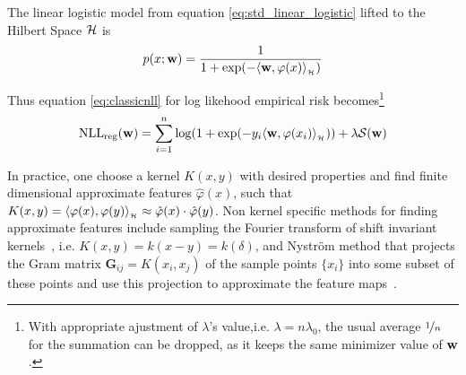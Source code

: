 The linear logistic model from equation \ref{eq:std_linear_logistic} lifted to
the Hilbert Space $\mathcal{H}$ is
\begin{equation}
\label{eq:hslogistic}
p(x;\mathrm{\mathbf{w}}) = \frac{1}{1+\exp(-\langle \mathrm{\mathbf{w}},\varphi(x)\rangle_{_{\mathcal{H}}})}
\end{equation}

Thus equation \ref{eq:classicnll} for log likehood empirical risk
becomes\footnote{With appropriate ajustment of $\lambda$'s value,i.e.
$\lambda=n\lambda_0$, the usual average $\nicefrac{1}{n}$ for the summation can
be dropped, as it keeps the same minimizer value of $\mathrm{\mathbf{w}}$.}
\begin{equation}
\label{eq:hsnll}
\text{NLL}_{\text{reg}}(\mathrm{\mathbf{w}}) =  \sum_{i=1}^n \log(1+\exp(-y_i
\langle \mathrm{\mathbf{w}},\varphi(x_i)\rangle_{_{\mathcal{H}}})) +\lambda\mathcal{S}(\mathrm{\mathbf{w}})
\end{equation}

In practice, one choose a kernel $K(x,y)$ with desired properties and
find finite dimensional approximate features $\hat\varphi(x)$, such that
$K(x,y)=\langle \varphi(x),\varphi(y)\rangle_{_{\mathcal{H}}}\approx\hat\varphi(x)\cdot\hat\varphi(y)$.
Non kernel specific methods for finding approximate features include sampling
the Fourier transform of shift invariant kernels~\cite{rahimi2007random}, i.e.
$K(x,y)=k(x-y)=k(\delta)$, and Nystr\"om method that projects the Gram matrix
$\mathbf{G}_{ij}=K(x_i,x_j)$ of the sample points $\{x_i\}$ into some subset of
these points and use this projection to approximate the feature
maps~\cite{williams2000using}.
